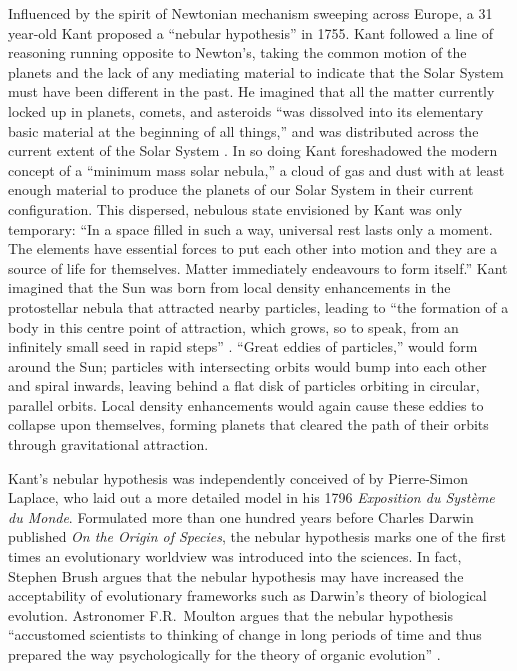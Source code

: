 \documentclass[12pt,oneside]{book}
\begin{document}
Influenced by the spirit of Newtonian mechanism sweeping across Europe, a 31 year-old Kant proposed a ``nebular hypothesis'' in 1755.
Kant followed a line of reasoning running opposite to Newton's, taking the common motion of the planets and the lack of any mediating material to indicate that the Solar System must have been different in the past.
He imagined that all the matter currently locked up in planets, comets, and asteroids ``was dissolved into its elementary basic material at the beginning of all things,'' and was distributed across the current extent of the Solar System \citep[227]{kant_2012}.
In so doing Kant foreshadowed the modern concept of a ``minimum mass solar nebula,'' a cloud of gas and dust with at least enough material to produce the planets of our Solar System in their current configuration.
This dispersed, nebulous state envisioned by Kant was only temporary: ``In a space filled in such a way, universal rest lasts only a moment. The elements have essential forces to put each other into motion and they are a source of life for themselves. Matter immediately endeavours to form itself.''
Kant imagined that the Sun was born from local density enhancements in the protostellar nebula that attracted nearby particles, leading to ``the formation of a body in this centre point of attraction, which grows, so to speak, from an infinitely small seed in rapid steps'' \citep[][228-29]{kant_2012}.
``Great eddies of particles,'' would form around the Sun; particles with intersecting orbits would bump into each other and spiral inwards, leaving behind a flat disk of particles orbiting in circular, parallel orbits.
Local density enhancements would again cause these eddies to collapse upon themselves, forming planets that cleared the path of their orbits through gravitational attraction.

Kant's nebular hypothesis was independently conceived of by Pierre-Simon \\ Laplace, who laid out a more detailed model in his 1796 \textit{Exposition du Syst\`eme du Monde}.
Formulated more than one hundred years before Charles Darwin published \textit{On the Origin of Species}, the nebular hypothesis marks one of the first times an evolutionary worldview was introduced into the sciences.
In fact, Stephen Brush argues that the nebular hypothesis may have increased the acceptability of evolutionary frameworks such as Darwin's theory of biological evolution.
Astronomer F.R.~Moulton argues that the nebular hypothesis ``accustomed scientists to thinking of change in long periods of time and thus prepared the way psychologically for the theory of organic evolution'' \citep{brush87}.
\end{document}
